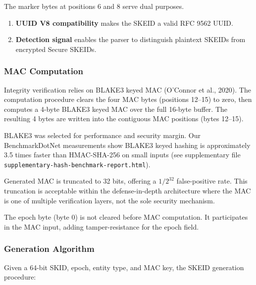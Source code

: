 \documentclass[fleqn,10pt,lineno]{wlpeerj}
\providecommand{\tightlist}{%
  \setlength{\itemsep}{0pt}\setlength{\parskip}{0pt}}
\begin{document}
The marker bytes at positions 6 and 8 serve dual purposes.

\begin{enumerate}
\def\labelenumi{\arabic{enumi}.}
\tightlist
\item
  \textbf{UUID V8 compatibility} makes the SKEID a valid RFC 9562 UUID.
\item
  \textbf{Detection signal} enables the parser to distinguish plaintext
  SKEIDs from encrypted Secure SKEIDs.
\end{enumerate}

\subsubsection{MAC Computation}\label{mac-computation}

Integrity verification relies on BLAKE3 keyed MAC (O'Connor et al.,
2020). The computation procedure clears the four MAC bytes (positions
12--15) to zero, then computes a 4-byte BLAKE3 keyed MAC over the full
16-byte buffer. The resulting 4 bytes are written into the contiguous
MAC positions (bytes 12--15).

BLAKE3 was selected for performance and security margin. Our
BenchmarkDotNet measurements show BLAKE3 keyed hashing is approximately
3.5 times faster than HMAC-SHA-256 on small inputs (see supplementary
file \texttt{supplementary-hash-benchmark-report.html}).

Generated MAC is truncated to 32 bits, offering a \(1/2^{32}\)
false-positive rate. This truncation is acceptable within the
defense-in-depth architecture where the MAC is one of multiple
verification layers, not the sole security mechanism.

The epoch byte (byte 0) is not cleared before MAC computation. It
participates in the MAC input, adding tamper-resistance for the epoch
field.

\newpage

\subsubsection{Generation Algorithm}\label{generation-algorithm-1}

Given a 64-bit SKID, epoch, entity type, and MAC key, the SKEID
generation procedure:
\end{document}
